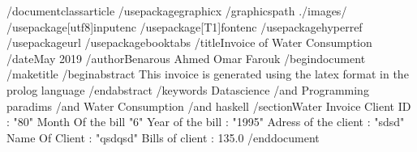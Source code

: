 /documentclass{article}
/usepackage{graphicx}
/graphicspath{ {./images/} }
/usepackage[utf8]{inputenc}
/usepackage[T1]{fontenc}
/usepackage{hyperref}
/usepackage{url}
/usepackage{booktabs}
/title{Invoice of Water Consumption}
/date{May 2019}
/author{Benarous Ahmed Omar Farouk }
/begin{document}
/maketitle
/begin{abstract}
This invoice is generated using the latex format in the prolog language
/end{abstract}
/keywords {Datascience /and Programming paradims /and Water Consumption /and haskell}
/section{Water Invoice}
Client ID : "80"
Month Of the bill "6"
Year of the bill : "1995"
Adress of the client : "sdsd"
Name Of Client : "qsdqsd"
Bills of client : 135.0
/end{document}